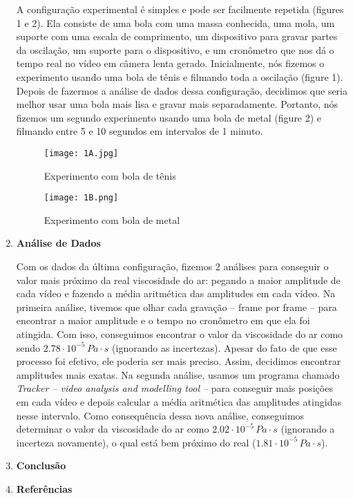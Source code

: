 \documentclass[a4paper, 12pt]{article}
\begin{document}
\begin{multicols}{2}
\begin{enumerate}
			
			A configuração experimental é simples e pode ser facilmente repetida (figures 1 e 2). Ela consiste de uma bola com uma massa conhecida, uma mola, um suporte com uma escala de comprimento, um dispositivo para gravar partes da oscilação, um suporte para o dispositivo, e um cronômetro que nos dá o tempo real no vídeo em câmera lenta gerado. \linebreak
			\linebreak Inicialmente, nós fizemos o experimento usando uma bola de tênis e filmando toda a oscilação (figure 1). Depois de fazermos a análise de dados dessa configuração, decidimos que seria melhor usar uma bola mais lisa e gravar mais separadamente. \linebreak
			Portanto, nós fizemos um segundo experimento usando uma bola de metal (figure 2) e filmando entre 5 e 10 segundos em intervalos de 1 minuto.\linebreak
			
			\begin{figure}[H]
			\centering
			\texttt{[image: 1A.jpg]}
			\caption{Experimento com bola de tênis}
			\end{figure}
			
			\begin{figure}[H]
			\centering
			\texttt{[image: 1B.png]}
			\caption{Experimento com bola de metal}
			\end{figure}
			
		\item \textbf{Análise de Dados}
		
		
			Com os dados da última configuração, fizemos 2 análises para conseguir o valor mais próximo da real viscosidade do ar: pegando a maior amplitude de cada vídeo e fazendo a média aritmética das amplitudes em cada vídeo. \linebreak
			Na primeira análise, tivemos que olhar cada gravação -- frame por frame -- para encontrar a maior amplitude e o tempo no cronômetro em que ela foi atingida. Com isso, conseguimos encontrar o valor da viscosidade do ar como sendo $2.78 \cdot 10^{-5} \, Pa \cdot s$ (ignorando as incertezas). Apesar do fato de que esse processo foi efetivo, ele poderia ser mais preciso. Assim, decidimos encontrar amplitudes mais exatas. \linebreak
			\linebreak Na segunda análise, usamos um programa chamado \textit{Tracker -- video analysis and modelling tool --} para conseguir mais posições em cada vídeo e depois calcular a média aritmética das amplitudes atingidas nesse intervalo. Como consequência dessa nova análise, conseguimos determinar o valor da viscosidade do ar como $2.02 \cdot 10^{-5} \, Pa \cdot s$ (ignorando a incerteza novamente), o qual está bem próximo do real ($1.81 \cdot 10^{-5} \, Pa \cdot s$). \linebreak
		\item \textbf{Conclusão}
		\item \textbf{Referências}
	\end{enumerate}
	\end{multicols}
\end{document}

